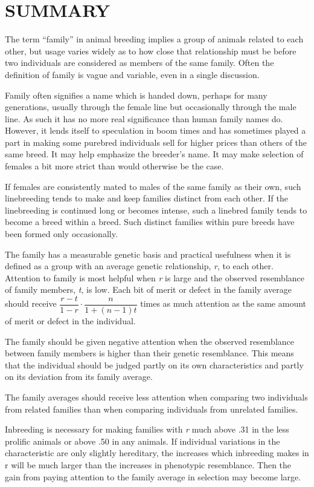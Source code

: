 \section*{SUMMARY}

The term ``family'' in animal breeding implies a group of animals
related to each other, but usage varies widely as to how close that relationship
must be before two individuals are considered as members of
the same family. Often the definition of family is vague and variable,
even in a single discussion.

Family often signifies a name which is handed down, perhaps for
many generations, usually through the female line but occasionally
through the male line. As such it has no more real significance than
human family names do. However, it lends itself to speculation in boom
times and has sometimes played a part in making some purebred individuals
sell for higher prices than others of the same breed. It may help
emphasize the breeder's name. It may make selection of females a bit
more strict than would otherwise be the case.

If females are consistently mated to males of the same family as their
own, such linebreeding tends to make and keep families distinct from
each other. If the linebreeding is continued long or becomes intense,
such a linebred family tends to become a breed within a breed. Such
distinct families within pure breeds have been formed only occasionally.

The family has a measurable genetic basis and practical usefulness
when it is defined as a group with an average genetic relationship,
\textit{r}, to each other. Attention to family is most helpful when
\textit{r} is large and the observed resemblance of family members,
\textit{t}, is low. Each bit of merit or defect in the family average
should receive $\dfrac{r - t}{1 - r} \cdot \dfrac{n}{1 + (n - 1)t}$
times as much attention as the same amount of merit or defect in the
individual.

The family should be given negative attention when the observed
resemblance between family members is higher than their genetic
resemblance. This means that the individual should be judged partly
on its own characteristics and partly on its deviation from its family
average.

The family averages should receive less attention when comparing
two individuals from related families than when comparing individuals
from unrelated families.

Inbreeding is necessary for making families with \textit{r} much above .31
in the less prolific animals or above .50 in any animals. If individual
variations in the characteristic are only slightly hereditary, the increases
which inbreeding makes in r will be much larger than the increases in
phenotypic resemblance. Then the gain from paying attention to the
family average in selection may become large.

